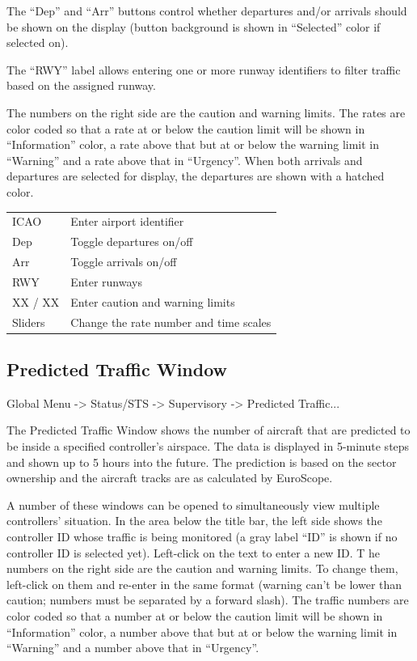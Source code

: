 \documentclass[11pt,a4paper,oldfontcommands]{memoir}
\begin{document}
The “Dep” and “Arr” buttons control whether departures and/or arrivals should be shown on the display (button background is shown in “Selected” color if selected on).

The “RWY” label allows entering one or more runway identifiers to filter traffic based on the assigned runway.

The numbers on the right side are the caution and warning limits. The rates are color coded so that a rate at or below the caution limit will be shown in “Information” color, a rate above that but at or below the warning limit in “Warning” and a rate above that in “Urgency”. When both arrivals and departures are selected for display, the departures are shown with a hatched color.

\begin{tabular}{l l}
    ICAO        & Enter airport identifier\\
    Dep         & Toggle departures on/off\\
    Arr         & Toggle arrivals on/off\\
    RWY         & Enter runways\\
    XX / XX     & Enter caution and warning limits\\
    Sliders     & Change the rate number and time scales  \\  
\end{tabular}

\subsection{Predicted Traffic Window}
\label{win:ptw}

Global Menu -> Status/STS -> Supervisory -> Predicted Traffic...

The Predicted Traffic Window shows the number of aircraft that are predicted to be inside a specified controller’s airspace. The data is displayed in 5-minute steps and shown up to 5 hours into the future. The prediction is based on the sector ownership and the aircraft tracks are as calculated by EuroScope.

A number of these windows can be opened to simultaneously view multiple controllers’ situation. In the area below the title bar, the left side shows the controller ID whose traffic is being monitored (a gray label “ID” is shown if no controller ID is selected yet). Left-click on the text to enter a new ID.
T
he numbers on the right side are the caution and warning limits. To change them, left-click on them and re-enter in the same format (warning can’t be lower than caution; numbers must be separated by a forward slash). The traffic numbers are color coded so that a number at or below the caution limit will be shown in “Information” color, a number above that but at or below the warning limit in “Warning” and a number above that in “Urgency”.
\end{document}
